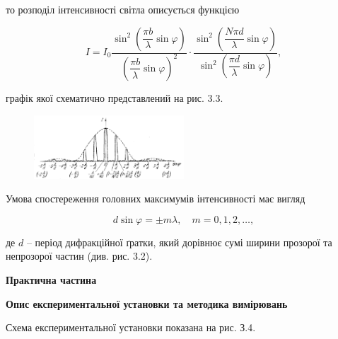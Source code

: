 \documentclass[12pt,a4paper]{article}
\begin{document}
    то розподіл інтенсивності світла описується функцією

    \begin{equation}
        \displaystyle I = I_0 \dfrac{\sin^2 \left( \dfrac{\pi b}{\lambda} \sin \varphi \right)}{\left( \dfrac{\pi b}{\lambda} \sin \varphi \right)^2} \cdot \dfrac{\sin^2 \left( \dfrac{N\pi d}{\lambda} \sin \varphi \right)}{\sin^2 \left( \dfrac{\pi d}{\lambda} \sin \varphi \right)},
        \tag{3.4}
    \end{equation}

    графік якої схематично представлений на рис. 3.3.

    \begin{figure}[!ht]

        \renewcommand{\thefigure}{3.\arabic{figure}} %

        \centering
        \includegraphics[width=0.5\textwidth]{3.3.png}
        \caption{}
        \label{fig3:schema}

    \end{figure}

    Умова спостереження головних максимумів інтенсивності має вигляд

    \begin{equation}
        d \sin \varphi = \pm m\lambda, \quad m = 0, 1, 2, \dots,
        \tag{3.5}
    \end{equation}

    де $d$ – період дифракційної ґратки, який дорівнює сумі ширини прозорої та
    непрозорої частин (див. рис. 3.2).

    \newpage

    \begin{center} \textbf{\Large Практична частина} \end{center}

    \begin{center} \textbf{Опис експериментальної установки та методика вимірювань} \end{center}

    Схема експериментальної установки показана на рис. З.4.
\end{document}
